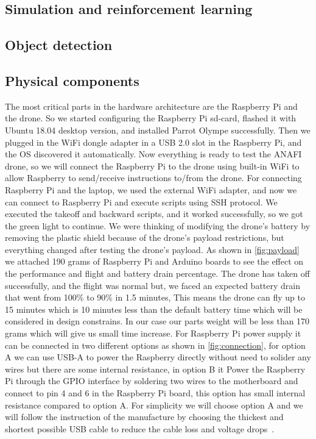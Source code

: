 \documentclass[../main.tex]{subfiles}
\begin{document}
\subsection{Simulation and reinforcement learning}

\lipsum[1]

\subsection{Object detection}

\lipsum[1]

\subsection{Physical components}
The most critical parts in the hardware architecture are the Raspberry Pi and the drone. So we started configuring the Raspberry Pi sd-card, flashed it with Ubuntu 18.04 desktop version, and installed Parrot Olympe successfully. Then we plugged in the WiFi dongle adapter in a USB 2.0 slot in the Raspberry Pi, and the OS discovered it automatically. Now everything is ready to test the  \textsc{ANAFI} drone, so we will connect the Raspberry Pi to the drone using built-in WiFi to allow Raspberry to send/receive instructions to/from the drone. For connecting Raspberry Pi and the laptop, we used the external WiFi adapter, and now we can connect to Raspberry Pi and execute scripts using SSH protocol. We executed the takeoff and backward scripts, and it worked successfully, so we got the green light to continue. We were thinking of modifying the drone's battery by removing the plastic shield because of the drone's payload restrictions, but everything changed after testing the drone's payload. As shown in \cref{fig:payload} we attached 190 grams of Raspberry Pi and Arduino boards to see the effect on the performance and flight and battery drain percentage. The drone has taken off successfully, and the flight was normal but, we faced an expected battery drain that went from 100\% to 90\% in 1.5 minutes, This means the drone can fly up to 15 minutes which is 10 minutes less than the default battery time which will be considered in design constrains. In our case our parts weight will be less than 170 grams which will give us small time increase. For Raspberry Pi power supply it can be connected in two different options as shown in \cref{fig:connection}, for option A we can use USB-A to power the Raspberry directly without need to solider any wires but there are some internal resistance, in option B it Power the Raspberry Pi through the GPIO interface by soldering two wires to the motherboard and connect to pin 4 and 6 in the Raspberry Pi board, this option has small internal resistance compared to option A. For simplicity we will choose option A and we will follow the instruction of the manufacture by choosing the thickest and shortest possible USB cable to reduce the cable loss and voltage drops~\cite{makerfocus}. 	 
\end{document}
